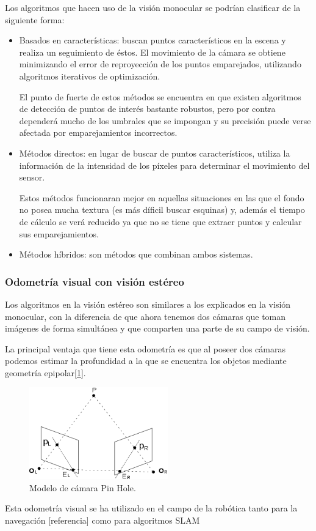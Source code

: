 \documentclass{bmvc2k}
\begin{document}
Los algoritmos que hacen uso de la visión monocular se podrían clasificar de la siguiente forma:
\begin{itemize}
	\item Basados en características: buscan puntos característicos en la escena y realiza un seguimiento de éstos. El movimiento de la cámara se obtiene minimizando el error de reproyección de los puntos emparejados, utilizando algoritmos iterativos de optimización.
	
	El punto de fuerte de estos métodos se encuentra en que existen algoritmos de detección de puntos de interés bastante robustos, pero por contra dependerá mucho de los umbrales que se impongan y su precisión puede verse afectada por emparejamientos incorrectos.

	\item Métodos directos: en lugar de buscar de puntos característicos, utiliza la información de la intensidad de los píxeles para determinar el movimiento del sensor.
	
	Estos métodos funcionaran mejor en aquellas situaciones en las que el fondo no posea mucha textura (es más díficil buscar esquinas) y, además el tiempo de cálculo se verá reducido ya que no se tiene que extraer puntos y calcular sus emparejamientos.
	
	\item Métodos híbridos: son métodos que combinan ambos sistemas.
\end{itemize}

\subsubsection{Odometría visual con visión estéreo}
Los algoritmos en la visión estéreo son similares a los explicados en la visión monocular, con la diferencia de que ahora tenemos dos cámaras que toman imágenes de forma simultánea y que
comparten una parte de su campo de visión.

La principal ventaja que tiene esta odometría es que al poseer dos cámaras podemos estimar la profundidad a la que se encuentra los objetos mediante geometría epipolar[\ref{fig:epipolar}].
\begin{figure}[H]
	\centering\includegraphics[width=6cm]{images/epipolar.png}
	\caption{Modelo de cámara Pin Hole. }
	\label{fig:epipolar}
\end{figure}
Esta odometría visual se ha utilizado en el campo de la robótica tanto para la navegación [referencia] como para algoritmos SLAM
\end{document}
